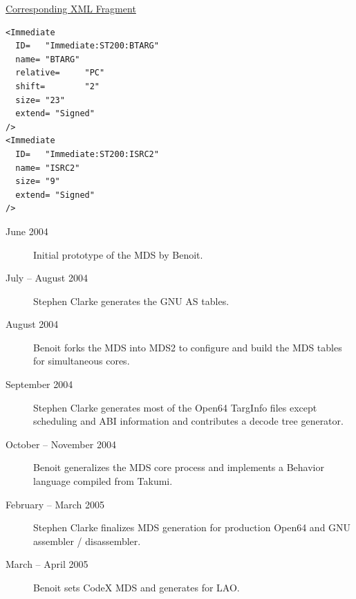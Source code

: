 \documentclass[a4]{seminar}
\begin{document}
\begin{slide}

\begin{center} \underline{Corresponding XML Fragment} \end{center}

{\small
\begin{verbatim}
<Immediate
  ID=   "Immediate:ST200:BTARG"
  name= "BTARG"
  relative=     "PC"
  shift=        "2"
  size= "23"
  extend= "Signed"
/>
<Immediate
  ID=   "Immediate:ST200:ISRC2"
  name= "ISRC2"
  size= "9"
  extend= "Signed"
/>
\end{verbatim}
}

\end{slide}


\begin{slide}


\begin{description}

\item[June 2004] Initial prototype of the MDS by Benoit.

\item[July -- August 2004] Stephen Clarke generates the GNU AS tables.

\item[August 2004] Benoit forks the MDS into MDS2 to configure and build the MDS
tables for simultaneous cores.

\item[September 2004] Stephen Clarke generates most of the Open64 TargInfo files
except scheduling and ABI information and contributes a decode tree generator.

\item[October -- November 2004] Benoit generalizes the MDS core process
and implements a Behavior language compiled from Takumi.

\item[February -- March 2005] Stephen Clarke finalizes MDS generation for
production Open64 and GNU assembler / disassembler.

\item[March -- April 2005] Benoit sets CodeX MDS and generates for LAO.

\end{description}

\end{slide}
\end{document}
